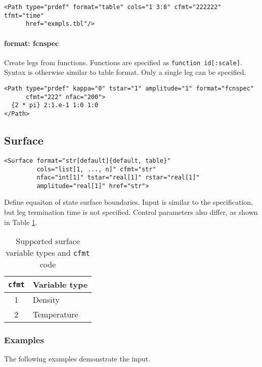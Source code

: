 \documentclass[11pt]{report}
\newcommand{\reqdtag}[1]{\Red{\texttt{<#1>}}}
\newcommand{\supporting}[1]{\texttt{Supporting Drivers: #1}}
\begin{document}
\begin{verbatim}
<Path type="prdef" format="table" cols="1 3:8" cfmt="222222" tfmt="time"
      href="exmpls.tbl"/>
\end{verbatim}

\paragraph{format: fcnspec} Create legs from functions. Functions are specified
as \texttt{function id[:scale]}.  Syntax is otherwise similar to table format.
Only a single leg can be specified.
\begin{verbatim}
<Path type="prdef" kappa="0" tstar="1" amplitude="1" format="fcnspec"
      cfmt="222" nfac="200">
  {2 * pi} 2:1.e-1 1:0 1:0
</Path>
\end{verbatim}

\subsection{Surface}
\begin{verbatim}
<Surface format="str[default]{default, table}"
         cols="list[1, ..., n]" cfmt="str"
         nfac="int[1]" tstar="real[1]" rstar="real[1]"
         amplitude="real[1]" href="str">
\end{verbatim}
%
Define equaiton of state surface boundaries. Input is similar to the
\reqdtag{Path} specification, but leg termination time is not specified.
Control parameters also differ, as shown in Table \ref{tab:cfmt-1}.

\begin{table}[h!]
  \centering
  \begin{tabular}[h]{cl}
    \hline
    \hline
    \texttt{cfmt} & Variable type \\
    \hline
    1 & Density \\
    2 & Temperature
  \end{tabular}
  \caption{Supported surface variable types and \texttt{cfmt} code}
  \label{tab:cfmt-1}
\end{table}

\subsubsection{Examples}
The following examples demonstrate the \reqdtag{Surface} input.
\end{document}

